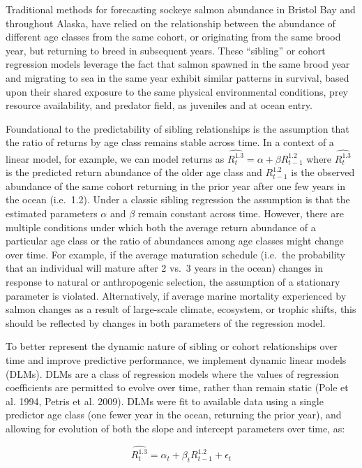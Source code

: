 \documentclass[
]{article}
\begin{document}
Traditional methods for forecasting sockeye salmon abundance in Bristol Bay and throughout Alaska, have relied on the relationship between the abundance of different age classes from the same cohort, or originating from the same brood year, but returning to breed in subsequent years. These ``sibling'' or cohort regression models leverage the fact that salmon spawned in the same brood year and migrating to sea in the same year exhibit similar patterns in survival, based upon their shared exposure to the same physical environmental conditions, prey resource availability, and predator field, as juveniles and at ocean entry.

Foundational to the predictability of sibling relationships is the assumption that the ratio of returns by age class remains stable across time. In a context of a linear model, for example, we can model returns as \(\hat{R^{1.3}_t} = \alpha + \beta{R^{1.2}_{t-1}}\) where \(\hat{R^{1.3}_t}\) is the predicted return abundance of the older age class and \(R^{1.2}_{t-1}\) is the observed abundance of the same cohort returning in the prior year after one few years in the ocean (i.e.~1.2). Under a classic sibling regression the assumption is that the estimated parameters \(\alpha\) and \(\beta\) remain constant across time. However, there are multiple conditions under which both the average return abundance of a particular age class or the ratio of abundances among age classes might change over time. For example, if the average maturation schedule (i.e.~the probability that an individual will mature after 2 vs.~3 years in the ocean) changes in response to natural or anthropogenic selection, the assumption of a stationary parameter is violated. Alternatively, if average marine mortality experienced by salmon changes as a result of large-scale climate, ecosystem, or trophic shifts, this should be reflected by changes in both parameters of the regression model.

To better represent the dynamic nature of sibling or cohort relationships over time and improve predictive performance, we implement dynamic linear models (DLMs). DLMs are a class of regression models where the values of regression coefficients are permitted to evolve over time, rather than remain static (Pole et al. 1994, Petris et al. 2009). DLMs were fit to available data using a single predictor age class (one fewer year in the ocean, returning the prior year), and allowing for evolution of both the slope and intercept parameters over time, as:

\[\hat{R^{1.3}_t} = \alpha_t + \beta_t{R^{1.2}_{t-1}} + \epsilon_t\]
\end{document}
